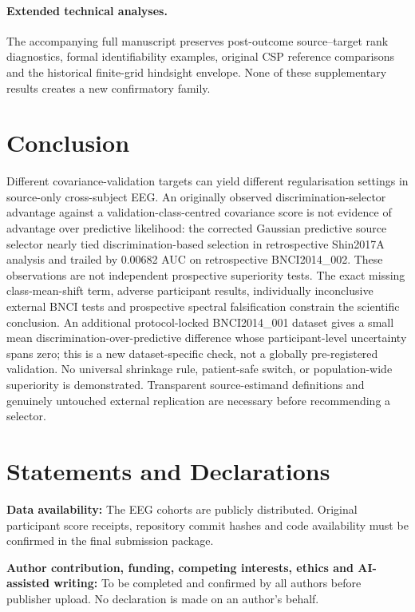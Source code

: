 \documentclass[11pt,a4paper]{article}
\begin{document}
\paragraph{Extended technical analyses.}
The accompanying full manuscript preserves post-outcome source--target
rank diagnostics, formal identifiability examples, original CSP reference
comparisons and the historical finite-grid hindsight envelope. None
of these supplementary results creates a new confirmatory family.

\section{Conclusion}
Different covariance-validation targets can yield different
regularisation settings in source-only cross-subject EEG. An originally observed
discrimination-selector advantage against a validation-class-centred
covariance score is not evidence of advantage over predictive
likelihood: the corrected Gaussian predictive source selector
nearly tied discrimination-based selection in retrospective
Shin2017A analysis and trailed by 0.00682 AUC on
retrospective BNCI2014\_002. These observations are
not independent prospective superiority tests. The exact missing class-mean-shift term, adverse
participant results, individually inconclusive external BNCI
tests and prospective spectral falsification constrain the
scientific conclusion. An additional protocol-locked BNCI2014\_001 dataset gives a
small mean discrimination-over-predictive difference whose
participant-level uncertainty spans zero; this is a new
dataset-specific check, not a globally pre-registered validation.
No universal shrinkage rule, patient-safe
switch, or population-wide superiority is demonstrated.
Transparent source-estimand definitions and genuinely untouched
external replication are necessary before recommending a selector.

\section*{Statements and Declarations}
\textbf{Data availability:} The EEG cohorts are publicly distributed.
Original participant score receipts, repository commit hashes and code
availability must be confirmed in the final submission package.

\textbf{Author contribution, funding, competing interests, ethics and
AI-assisted writing:} To be completed and confirmed by all authors before
publisher upload. No declaration is made on an author's behalf.



\end{document}
